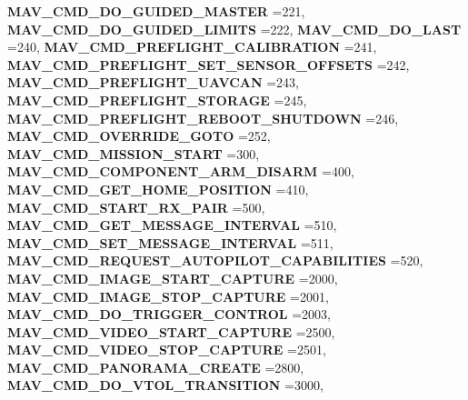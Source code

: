 \begin{DoxyCompactItemize}
\textbf{ M\+A\+V\+\_\+\+C\+M\+D\+\_\+\+D\+O\+\_\+\+G\+U\+I\+D\+E\+D\+\_\+\+M\+A\+S\+T\+ER} =221, 
\textbf{ M\+A\+V\+\_\+\+C\+M\+D\+\_\+\+D\+O\+\_\+\+G\+U\+I\+D\+E\+D\+\_\+\+L\+I\+M\+I\+TS} =222, 
\textbf{ M\+A\+V\+\_\+\+C\+M\+D\+\_\+\+D\+O\+\_\+\+L\+A\+ST} =240, 
\textbf{ M\+A\+V\+\_\+\+C\+M\+D\+\_\+\+P\+R\+E\+F\+L\+I\+G\+H\+T\+\_\+\+C\+A\+L\+I\+B\+R\+A\+T\+I\+ON} =241, 
\newline
\textbf{ M\+A\+V\+\_\+\+C\+M\+D\+\_\+\+P\+R\+E\+F\+L\+I\+G\+H\+T\+\_\+\+S\+E\+T\+\_\+\+S\+E\+N\+S\+O\+R\+\_\+\+O\+F\+F\+S\+E\+TS} =242, 
\textbf{ M\+A\+V\+\_\+\+C\+M\+D\+\_\+\+P\+R\+E\+F\+L\+I\+G\+H\+T\+\_\+\+U\+A\+V\+C\+AN} =243, 
\textbf{ M\+A\+V\+\_\+\+C\+M\+D\+\_\+\+P\+R\+E\+F\+L\+I\+G\+H\+T\+\_\+\+S\+T\+O\+R\+A\+GE} =245, 
\textbf{ M\+A\+V\+\_\+\+C\+M\+D\+\_\+\+P\+R\+E\+F\+L\+I\+G\+H\+T\+\_\+\+R\+E\+B\+O\+O\+T\+\_\+\+S\+H\+U\+T\+D\+O\+WN} =246, 
\newline
\textbf{ M\+A\+V\+\_\+\+C\+M\+D\+\_\+\+O\+V\+E\+R\+R\+I\+D\+E\+\_\+\+G\+O\+TO} =252, 
\textbf{ M\+A\+V\+\_\+\+C\+M\+D\+\_\+\+M\+I\+S\+S\+I\+O\+N\+\_\+\+S\+T\+A\+RT} =300, 
\textbf{ M\+A\+V\+\_\+\+C\+M\+D\+\_\+\+C\+O\+M\+P\+O\+N\+E\+N\+T\+\_\+\+A\+R\+M\+\_\+\+D\+I\+S\+A\+RM} =400, 
\textbf{ M\+A\+V\+\_\+\+C\+M\+D\+\_\+\+G\+E\+T\+\_\+\+H\+O\+M\+E\+\_\+\+P\+O\+S\+I\+T\+I\+ON} =410, 
\newline
\textbf{ M\+A\+V\+\_\+\+C\+M\+D\+\_\+\+S\+T\+A\+R\+T\+\_\+\+R\+X\+\_\+\+P\+A\+IR} =500, 
\textbf{ M\+A\+V\+\_\+\+C\+M\+D\+\_\+\+G\+E\+T\+\_\+\+M\+E\+S\+S\+A\+G\+E\+\_\+\+I\+N\+T\+E\+R\+V\+AL} =510, 
\textbf{ M\+A\+V\+\_\+\+C\+M\+D\+\_\+\+S\+E\+T\+\_\+\+M\+E\+S\+S\+A\+G\+E\+\_\+\+I\+N\+T\+E\+R\+V\+AL} =511, 
\textbf{ M\+A\+V\+\_\+\+C\+M\+D\+\_\+\+R\+E\+Q\+U\+E\+S\+T\+\_\+\+A\+U\+T\+O\+P\+I\+L\+O\+T\+\_\+\+C\+A\+P\+A\+B\+I\+L\+I\+T\+I\+ES} =520, 
\newline
\textbf{ M\+A\+V\+\_\+\+C\+M\+D\+\_\+\+I\+M\+A\+G\+E\+\_\+\+S\+T\+A\+R\+T\+\_\+\+C\+A\+P\+T\+U\+RE} =2000, 
\textbf{ M\+A\+V\+\_\+\+C\+M\+D\+\_\+\+I\+M\+A\+G\+E\+\_\+\+S\+T\+O\+P\+\_\+\+C\+A\+P\+T\+U\+RE} =2001, 
\textbf{ M\+A\+V\+\_\+\+C\+M\+D\+\_\+\+D\+O\+\_\+\+T\+R\+I\+G\+G\+E\+R\+\_\+\+C\+O\+N\+T\+R\+OL} =2003, 
\textbf{ M\+A\+V\+\_\+\+C\+M\+D\+\_\+\+V\+I\+D\+E\+O\+\_\+\+S\+T\+A\+R\+T\+\_\+\+C\+A\+P\+T\+U\+RE} =2500, 
\newline
\textbf{ M\+A\+V\+\_\+\+C\+M\+D\+\_\+\+V\+I\+D\+E\+O\+\_\+\+S\+T\+O\+P\+\_\+\+C\+A\+P\+T\+U\+RE} =2501, 
\textbf{ M\+A\+V\+\_\+\+C\+M\+D\+\_\+\+P\+A\+N\+O\+R\+A\+M\+A\+\_\+\+C\+R\+E\+A\+TE} =2800, 
\textbf{ M\+A\+V\+\_\+\+C\+M\+D\+\_\+\+D\+O\+\_\+\+V\+T\+O\+L\+\_\+\+T\+R\+A\+N\+S\+I\+T\+I\+ON} =3000, 

\end{DoxyCompactItemize}
